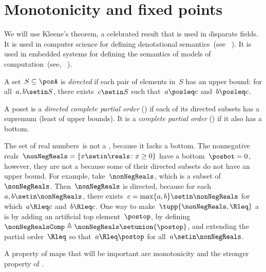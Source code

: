 
\section{Monotonicity and fixed points}
\label{sec:Monotonicity-and-fixed}

We will use Kleene's theorem, a celebrated result that is used in disparate fields.
It is used in computer science for defining denotational semantics~(see \eg~\cite{manes86}).
It is used in embedded systems for defining the semantics of models of computation~(see, \eg~\cite{lee10}).

\begin{definition}
    \label{def:directed-set}
    A set~$S\subseteq\posA$ is \emph{directed} if each pair of elements in~$S$ has an upper bound: for all~$a,b\setin S$, there exists~$c\setin S$ such that~$a\posleq c$ and~$b\posleq c$.
\end{definition}

\begin{definition}[Completeness]
    \label{def:cpo}
    A poset is a \emph{directed complete partial order} (\DCPO) if each of its directed subsets has a supremum (least of upper bounds).
    It is a \emph{complete partial order} (\CPO) if it also has a bottom.
\end{definition}

\begin{example}
    \label{exa:Rcomp}
    The set of real numbers~\reals is not a \CPO, because it lacks a bottom.
    The nonnegative reals~$\nonNegReals=\{x\setin\reals \colon x\geq0\}$ have a bottom~$\posbot=0$, however, they are not a \DCPO because some of their directed subsets do not have an upper bound.
    For example, take~$\nonNegReals$, which is a subset of~$\nonNegReals$.
    Then~$\nonNegReals$ is directed, because for each~$a,b\setin\nonNegReals$, there exists~$c=\max\{a,b\}\setin\nonNegReals$ for which~$a\Rleq c$ and~$b\Rleq c$.
    One way to make~$\tupp{ \nonNegReals,\Rleq} $ a \CPO is by adding an artificial top element~$\postop$, by defining~$\nonNegRealsComp\triangleq\nonNegReals\setunion\{\postop\}$, and extending the partial order~$\Rleq$ so that~$a\Rleq\postop$ for all~$a\setin\nonNegReals$.
\end{example}

A property of maps that will be important are monotonicity and the stronger property of \scottcontinuity.

